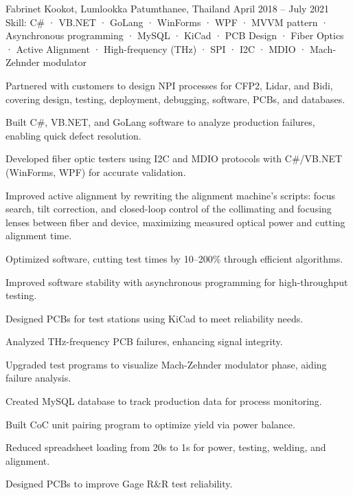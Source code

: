 \begin{cventries}
    {Fabrinet} %
    {Kookot, Lumlookka Patumthanee, Thailand} %
    {April 2018 -- July 2021} %
    {Skill: C\# · VB.NET · GoLang · WinForms · WPF · MVVM pattern · Asynchronous programming · MySQL · KiCad · PCB Design · Fiber Optics · Active Alignment · High-frequency (THz) · SPI · I2C · MDIO · Mach-Zehnder modulator} %
    {
      \begin{cvitems} %
        \item {Partnered with customers to design NPI processes for CFP2, Lidar, and Bidi, covering design, testing, deployment, debugging, software, PCBs, and databases.}
        \item {Built C\#, VB.NET, and GoLang software to analyze production failures, enabling quick defect resolution.}
        \item {Developed fiber optic testers using I2C and MDIO protocols with C\#/VB.NET (WinForms, WPF) for accurate validation.}
        \item {Improved active alignment by rewriting the alignment machine's scripts: focus search, tilt correction, and closed-loop control of the collimating and focusing lenses between fiber and device, maximizing measured optical power and cutting alignment time.}
        \item {Optimized software, cutting test times by 10–200\% through efficient algorithms.}
        \item {Improved software stability with asynchronous programming for high-throughput testing.}
        \item {Designed PCBs for test stations using KiCad to meet reliability needs.}
        \item {Analyzed THz-frequency PCB failures, enhancing signal integrity.}
        \item {Upgraded test programs to visualize Mach-Zehnder modulator phase, aiding failure analysis.}
        \item {Created MySQL database to track production data for process monitoring.}
        \item {Built CoC unit pairing program to optimize yield via power balance.}
        \item {Reduced spreadsheet loading from 20s to 1s for power, testing, welding, and alignment.}
        \item {Designed PCBs to improve Gage R\&R test reliability.}

\end{cvitems}}
\end{cventries}
